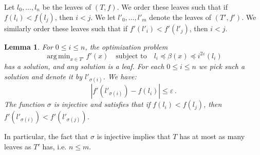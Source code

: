\documentclass{article}
\DeclareMathOperator*{\argmin}{arg\,min}
\newtheorem{lemma}[theorem]{Lemma}
\theoremstyle{definition}
\renewcommand{\epsilon}{\varepsilon}
\begin{document}
Let $l_0,\ldots,l_n$ be the leaves of $(T,f)$. We order these leaves such that if $f(l_i) < f(l_j)$, then $i < j$. We let $l'_0,\ldots,l'_m$ denote the leaves of $(T',f')$. We similarly order these leaves such that if $f'(l'_i) < f'(l'_j)$, then $i < j$.

\begin{lemma}
    \label{lem:sigma}
    For $0\leq i \leq n$, the optimization problem
    \begin{equation*}
        \argmin_{x\in T'} f'(x) \quad \text{subject to} \quad l_i \preceq \beta(x) \preceq i^{2\epsilon} (l_i)
    \end{equation*}
    has a solution, and any solution is a leaf. For each $0 \leq i \leq n$ we pick such a solution and denote it by $l'_{\sigma(i)}$. We have:
    \begin{equation*}
        |f'(l'_{\sigma(i)}) - f(l_i)| \leq \epsilon\,.
    \end{equation*}
    The function $\sigma$ is injective and satisfies that if $f(l_i) < f(l_j)$, then $f'(l'_{\sigma(i)}) < f'(l'_{\sigma(j)})$.
\end{lemma}

In particular, the fact that $\sigma$ is injective implies that $T$ has at most as many leaves as $T'$ has, i.e. $n \leq m$.
\end{document}
